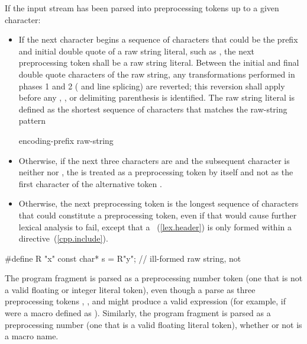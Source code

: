 \pnum
If the input stream has been parsed into preprocessing tokens up to a
given character:

\begin{itemize}
%
\item If the next character begins a sequence of characters that could be the prefix
and initial double quote of a raw string literal, such as , the next preprocessing
token shall be a raw string literal. Between the initial and final
double quote characters of the raw string, any transformations performed in phases
1 and 2 ( and line splicing) are reverted; this reversion
shall apply before any , , or delimiting
parenthesis is identified. The raw string literal is defined as the shortest sequence
of characters that matches the raw-string pattern

\begin{ncbnf}
encoding-prefix\opt{}  raw-string
\end{ncbnf}

\item Otherwise, if the next three characters are \tcode{<::} and the subsequent character
is neither \tcode{:} nor \tcode{>}, the \tcode{<} is treated as a preprocessing token by
itself and not as the first character of the alternative token \tcode{<:}.

\item Otherwise,
the next preprocessing token is the longest sequence of
characters that could constitute a preprocessing token, even if that
would cause further lexical analysis to fail,
except that a ~(\ref{lex.header}) is only formed
within a  directive~(\ref{cpp.include}).
\end{itemize}

\begin{example}
\begin{codeblock}
#define R "x"
const char* s = R"y";           // ill-formed raw string, not 
\end{codeblock}
\end{example}

\pnum
\begin{example} The program fragment  is parsed as a
preprocessing number token (one that is not a valid floating or integer
literal token), even though a parse as three preprocessing tokens
, \tcode{+}, and  might produce a valid expression (for example,
if  were a macro defined as ). Similarly, the
program fragment  is parsed as a preprocessing number (one
that is a valid floating literal token), whether or not  is a
macro name. \end{example}

